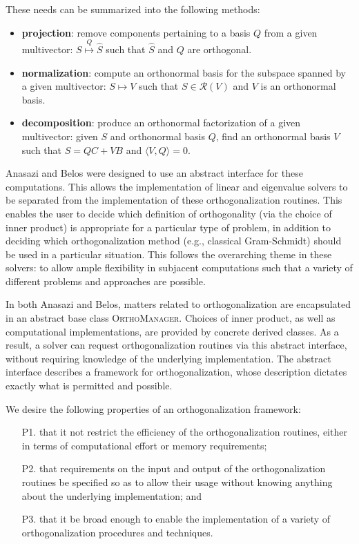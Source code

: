 \documentclass[12pt,letterpaper]{SANDreport}
\theoremstyle{example}
\newcommand{\inner}[2]{\langle #1,#2 \rangle}
\newcommand{\range}[1]{\mathcal{R}(#1)}
\begin{document}
These needs can be summarized into the following methods:
\begin{itemize}
  \item \textbf{projection}: remove components pertaining to a basis $Q$ from
    a given multivector: $S \stackrel{Q}{\mapsto} \hat{S}$ such that $\hat{S}$ and $Q$ are
    orthogonal.
  \item \textbf{normalization}: compute an orthonormal basis for the subspace spanned by
    a given multivector: $S \mapsto V$ such that $S \in
    \range{V}$ and $V$ is an orthonormal basis. 
  \item \textbf{decomposition}: produce an orthonormal factorization of a given
    multivector: given $S$ and orthonormal basis $Q$, find an orthonormal basis $V$ 
    such that $S = QC + VB$ and $\inner{V}{Q} = 0$.
\end{itemize}

Anasazi and Belos were designed to use an abstract interface for these computations. This
allows the implementation of linear and eigenvalue solvers to be separated from the
implementation of these orthogonalization routines. This enables the user to decide which
definition of orthogonality (via the choice of inner product) is appropriate for a
particular type of problem, in addition to deciding which orthogonalization method (e.g.,
classical Gram-Schmidt) should be used in a particular situation. This follows the
overarching theme in these solvers: to allow ample flexibility in subjacent computations
such that a variety of different problems and approaches are possible.

In both Anasazi and Belos, matters related to orthogonalization are encapsulated in an
abstract base class \textsc{OrthoManager}. Choices of inner product, as well as
computational implementations, are provided by concrete derived classes. As a result, a
solver can request orthogonalization routines via this abstract interface, without
requiring knowledge of the underlying implementation. The abstract interface describes a
framework for orthogonalization, whose description dictates exactly what is permitted and
possible.

We desire the following properties of an orthogonalization framework:
\begin{enumerate}
  \item[P1.] that it not restrict the efficiency of the orthogonalization routines, either in 
    terms of computational effort or memory requirements;
  \item[P2.] that requirements on the input and output of the orthogonalization routines
    be specified so as to allow their usage without knowing anything about the underlying
    implementation; and 
  \item[P3.] that it be broad enough to enable the implementation of a variety of 
    orthogonalization procedures and techniques.
\end{enumerate}
\end{document}
